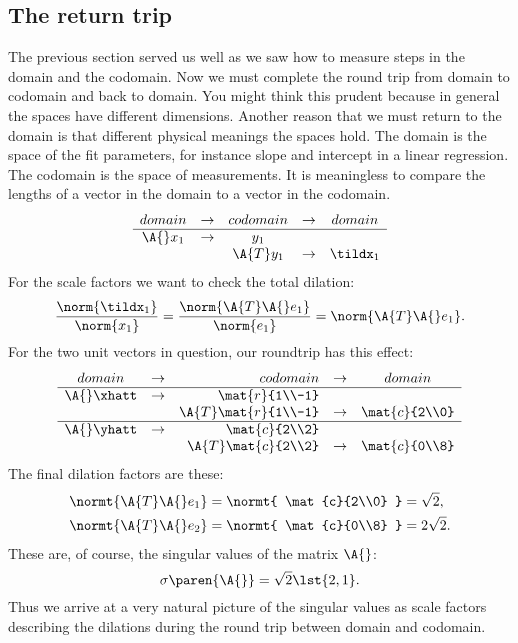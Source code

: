 \subsection{The return trip}
The previous section served us well as we saw how to measure steps in the domain and the codomain. Now we must complete the round trip from domain to codomain and back to domain. You might think this prudent because in general the spaces have different dimensions. Another reason that we must return to the domain is that different physical meanings the spaces hold. The domain is the space of the fit parameters, for instance slope and intercept in a linear regression. The codomain is the space of measurements. It is meaningless to compare the lengths of a vector in the domain to a vector in the codomain.
\begin{equation*}
  \begin{array}{cccccc}
    domain &\to& codomain &\to& domain \\\hline
    \A{}x_{1} &\to& y_{1} \\ && \A{T}y_{1} &\to& \tildx_{1}
  \end{array}
\end{equation*}
For the scale factors we want to check the total dilation:
\begin{equation}
  \frac{\norm{ \tildx_{1} }}{ \norm{x_{1}} } = \frac{\norm{ \A{T}\A{}e_{1} }}{ \norm{e_{1}} } = \norm{ \A{T}\A{}e_{1} }.
\end{equation}
For the two unit vectors in question, our roundtrip has this effect:
\begin{equation*}
  \begin{array}{ccrccc}
    domain &\to& codomain &\to& domain \\\hline
    \A{}\xhatt &\to& \mat{r}{1\\-1} \\ && \A{T}\mat{r}{1\\-1} &\to& \mat{c}{2\\0}\\\hline
    \A{}\yhatt &\to& \mat{c}{2\\2} \\ && \A{T}\mat{c}{2\\2} &\to& \mat{c}{0\\8}
  \end{array}
\end{equation*}
The final dilation factors are these:
\begin{equation}
  \begin{split}
     \normt{ \A{T}\A{}e_{1} } &= \normt{ \mat{c}{2\\0} } = \sqrt{ 2 },\\
     \normt{ \A{T}\A{}e_{2} } &= \normt{ \mat{c}{0\\8} } = 2\sqrt{ 2 }.
  \end{split}
\end{equation}
These are, of course, the singular values of the matrix $\A{}$:
\begin{equation}
  \sigma \paren{ \A{} } = \sqrt{ 2 } \lst{2, 1}.
\end{equation}
Thus we arrive at a very natural picture of the singular values as scale factors describing the dilations during the round trip between domain and codomain.

